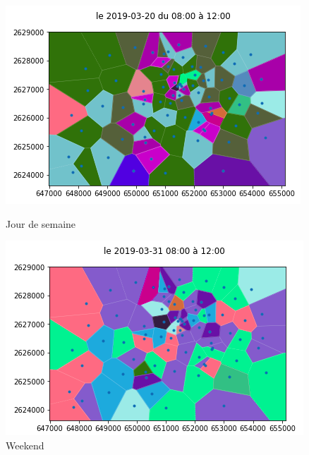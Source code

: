 \documentclass{report}
\begin{document}
\begin{figure}[H]
  \begin{minipage}{0.4\textwidth}
    \centering
    \includegraphics[scale=0.55]{images/S8_12.png}
    \caption{Jour de semaine}\label{Fig:Data1}
  \end{minipage}\hfill
  \begin{minipage}{0.4\textwidth}
    \centering
    \includegraphics[scale=0.55]{images/W8_12.png}
    \caption{Weekend}\label{Fig:Data2}
  \end{minipage}
\end{figure} 
\end{document}
